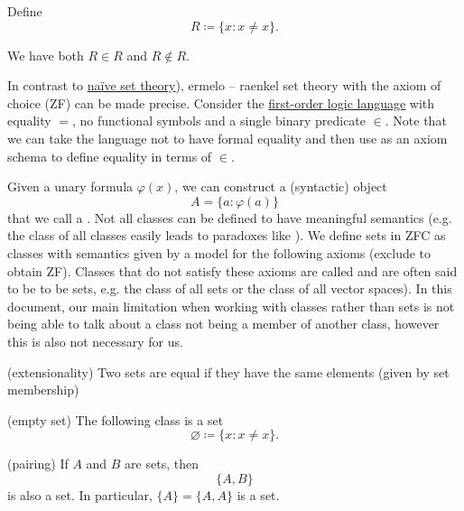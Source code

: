 \begin{example}\label{ex:russels_paradox_sets}
  Define
  \begin{equation*}
    R \coloneqq \{ x \colon x \neq x \}.
  \end{equation*}

  We have both \( R \in R \) and \( R \not\in R \).
\end{example}

\begin{definition}\label{def:set_zfc}
  In contrast to \hyperref[def:set_naive]{na\"ive set theory}), ermelo – raenkel set theory with the axiom of choice (ZF) can be made precise. Consider the \hyperref[def:first_order_logic_language]{first-order logic language} with equality \( = \), no functional symbols and a single binary predicate \( \in \). Note that we can take the language not to have formal equality and then use  as an axiom schema to define equality in terms of \( \in \).

  Given a unary formula \( \varphi(x) \), we can construct a (syntactic) object
  \begin{equation*}
    A = \{ a \colon \varphi(a) \}
  \end{equation*}
  that we call a . Not all classes can be defined to have meaningful semantics (e.g. the class of all classes easily leads to paradoxes like ). We define sets in ZFC as classes with semantics given by a model for the following axioms (exclude  to obtain ZF). Classes that do not satisfy these axioms are called  and are often said to be  to be sets, e.g. the class of all sets or the class of all vector spaces). In this document, our main limitation when working with classes rather than sets is not being able to talk about a class not being a member of another class, however this is also not necessary for us.

  \begin{DefEnum}
    (extensionality) Two sets are equal if they have the same elements (given by set membership)

    (empty set) The following class is a set
    \begin{equation*}
      \varnothing \coloneqq \{ x \colon x \neq x \}.
    \end{equation*}

    (pairing) If \( A \) and \( B \) are sets, then
    \begin{equation*}
      \{ A, B \}
    \end{equation*}
    is also a set. In particular, \( \{ A \} = \{ A, A \} \) is a set.


\end{DefEnum}
\end{definition}
